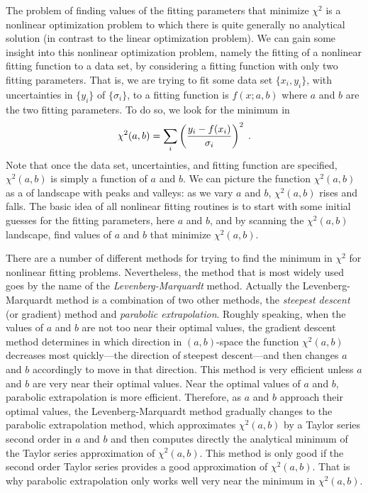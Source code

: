 \documentclass[letterpaper,10pt,english]{sphinxmanual}
\begin{document}
The problem of finding values of the fitting parameters that minimize \(\chi^2\) is a nonlinear optimization problem to which there is quite generally no analytical solution (in contrast to the linear optimization problem).  We can gain some insight into this nonlinear optimization problem, namely the fitting of a nonlinear fitting function to a data set, by considering a fitting function with only two fitting parameters.  That is, we are trying to fit some data set \(\{x_{i},y_{i}\}\), with uncertainties in \(\{y_{i}\}\) of \(\{\sigma_{i}\}\), to a fitting function is \(f(x;a,b)\) where \(a\) and \(b\) are the two fitting parameters.  To do so, we look for the minimum in
\begin{gather}
\begin{split}\chi^2(a,b) = \sum_{i} \left(\frac{y_{i} - f(x_{i})}{\sigma_{i}}\right)^2 \;.\end{split}\notag
\end{gather}
Note that once the data set, uncertainties, and fitting function are specified,  \(\chi^2(a,b)\) is simply a function of \(a\) and \(b\).  We can picture the function \(\chi^2(a,b)\) as a of landscape with peaks and valleys: as we vary \(a\) and \(b\), \(\chi^2(a,b)\) rises and falls.  The basic idea of all nonlinear fitting routines is to start with some initial guesses for the fitting parameters, here \(a\) and \(b\), and by scanning the \(\chi^2(a,b)\) landscape, find values of \(a\) and \(b\) that minimize \(\chi^2(a,b)\).

There are a number of different methods for trying to find the minimum in \(\chi^2\) for nonlinear fitting problems.  Nevertheless, the method that is most widely used goes by the name of the \emph{Levenberg-Marquardt} method.  Actually the Levenberg-Marquardt method is a combination of two other methods, the \emph{steepest descent} (or gradient) method and \emph{parabolic extrapolation}.  Roughly speaking, when the values of \(a\) and \(b\) are not too near their optimal values, the gradient descent method determines in which direction in \((a,b)\)-space the function \(\chi^2(a,b)\) decreases most quickly---the direction of steepest descent---and then changes \(a\) and \(b\) accordingly to move in that direction.  This method is very efficient unless \(a\) and \(b\) are very near their optimal values.  Near the optimal values of \(a\) and \(b\), parabolic extrapolation is more efficient.  Therefore, as  \(a\) and \(b\) approach their optimal values, the Levenberg-Marquardt method gradually changes to the parabolic extrapolation method, which approximates \(\chi^2(a,b)\) by a Taylor series second order in \(a\) and \(b\) and then computes directly the analytical minimum of the Taylor series approximation of \(\chi^2(a,b)\).  This method is only good if the second order Taylor series provides a good approximation of \(\chi^2(a,b)\).  That is why parabolic extrapolation only works well very near the minimum in \(\chi^2(a,b)\).
\end{document}
